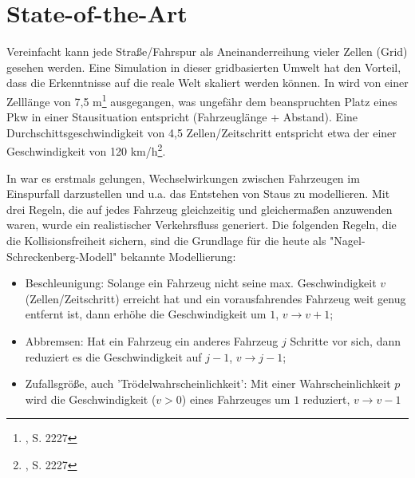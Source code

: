 \section{State-of-the-Art}
\label{sec:sota}

Vereinfacht kann jede Straße/Fahrspur als Aneinanderreihung vieler Zellen (Grid) gesehen werden. Eine Simulation in dieser gridbasierten Umwelt hat den Vorteil, dass die Erkenntnisse auf die reale Welt skaliert werden können. In \cite{na-sch} wird von einer Zelllänge von 7,5 m\footnote{\cite{na-sch}, S. 2227} ausgegangen, was ungefähr dem beanspruchten Platz eines Pkw in einer Stausituation entspricht (Fahrzeuglänge + Abstand). Eine Durchschittsgeschwindigkeit von 4,5 Zellen/Zeitschritt entspricht etwa der einer Geschwindigkeit von 120 km/h\footnote{\cite{na-sch}, S. 2227}.

In \cite{na-sch} war es erstmals gelungen, Wechselwirkungen zwischen Fahrzeugen im Einspurfall darzustellen und u.a. das Entstehen von Staus zu modellieren. Mit drei Regeln, die auf jedes Fahrzeug gleichzeitig und gleichermaßen anzuwenden waren, wurde ein realistischer Verkehrsfluss generiert. Die folgenden Regeln, die die Kollisionsfreiheit sichern, sind die Grundlage für die heute als "Nagel-Schreckenberg-Modell" bekannte Modellierung: 

\begin{itemize}
\item Beschleunigung: Solange ein Fahrzeug nicht seine max. Geschwindigkeit $v$ (Zellen/Zeitschritt) erreicht hat und ein vorausfahrendes Fahrzeug weit genug entfernt ist, dann erhöhe die Geschwindigkeit um $1$, $v \rightarrow v+1$;
\item Abbremsen: Hat ein Fahrzeug ein anderes Fahrzeug $j$ Schritte vor sich, dann reduziert es die Geschwindigkeit auf $j-1$, $v \rightarrow j-1$;
\item Zufallsgröße, auch 'Trödelwahrscheinlichkeit': Mit einer Wahrscheinlichkeit $p$ wird die Geschwindigkeit ($v > 0$) eines Fahrzeuges um $1$ reduziert, $v \rightarrow v-1$
\end{itemize}

